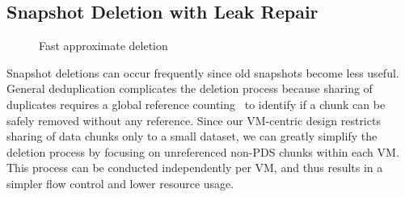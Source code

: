 
\subsection{Snapshot Deletion with Leak Repair}
\label{sect:delete}


\begin{figure}[htbp]
  \centering
  \caption{Fast approximate deletion}
  \label{fig:deletion_flow}
\end{figure}

Snapshot deletions can occur frequently since old snapshots become less useful.
General deduplication complicates the deletion process because sharing of duplicates
requires a global reference counting~\cite{Guo2011,Fabiano2013} 
 to identify if  a chunk can be  safely removed without any reference.
%
Since our VM-centric design restricts sharing of data chunks only to a small dataset,
we can greatly simplify the deletion process by 
focusing on  unreferenced non-PDS chunks within each VM. 
This process can be conducted independently per VM, and thus results in  a simpler flow control and 
lower resource usage. 

